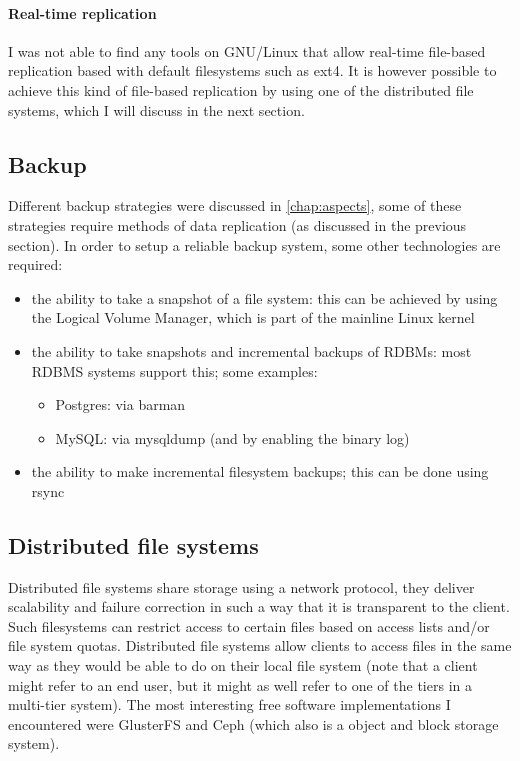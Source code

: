 \documentclass[12pt]{report}
\begin{document}
\paragraph*{Real-time replication}
I was not able to find any tools on GNU/Linux that allow real-time
file-based replication based with default filesystems such as ext4.
It is however possible to achieve this kind of file-based replication
by using one of the distributed file systems, which I will discuss in
the next section.

\subsection{Backup}
Different backup strategies were discussed in 
\cref{chap:aspects}, some of these strategies require methods of data
replication (as discussed in the previous section).
In order to setup a reliable backup system, some other technologies
are required: 
\begin{itemize}
\item the ability to take a snapshot of a file system: this can be
  achieved by using the Logical Volume Manager, which is part of the
  mainline Linux kernel \cite{linux_kernel_soft:2013}
\item the ability to take snapshots and incremental backups of RDBMs: most RDBMS systems
  support this; some examples:
  \begin{itemize}
  \item Postgres: via barman \cite{barman_software:2013}
  \item MySQL: via mysqldump (and by enabling the binary log)
  \end{itemize}
\item the ability to make incremental filesystem backups; this can be
  done using rsync \cite{rsync_software:2013}
\end{itemize}
\subsection{Distributed file systems}
Distributed file systems share storage using a network protocol, they
deliver scalability and failure
correction in such a way that it is transparent to the client.
Such filesystems can restrict access to certain files based on access lists
and/or file system quotas. Distributed file systems allow clients to
access files in the same way as they would be able to do on their
local file system (note that a client might refer to an end user, 
but it might as well refer to one of the tiers in a multi-tier
system).
The most interesting free software implementations I encountered were
GlusterFS \cite{glusterfs_soft:2013} and Ceph \cite{ceph_soft:2013}
(which also is a object and block storage system).
\end{document}
